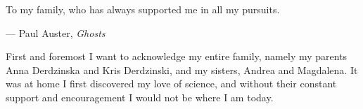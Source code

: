 \begin{frontmatter}
\makefrontmatter


\begin{dedication}                                                             
To my family, who has always supported me in all my pursuits.
\end{dedication}                                                               
\clearpage 


\begin{myepigraph} %
  \vfil                                                                        
  \vfil 
\begin{centering}
\end{centering}
  \vfil 
  \vfil 
  \hfill --- Paul Auster, {\it Ghosts}
  \vfil 
\end{myepigraph}                                                               

\tableofcontents
\listoffigures  %
\listoftables   %

\begin{acknowledgements}                                                       
First and foremost I want to acknowledge my entire family, namely my parents Anna Derdzinska and Kris Derdzinski, and my sisters, Andrea and Magdalena. It was at home I first discovered my love of science, and without their constant support and encouragement I would not be where I am today.


\end{acknowledgements}
\end{frontmatter}
